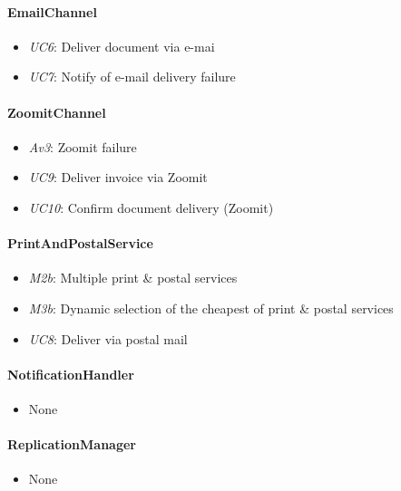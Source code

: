 \documentclass[a4paper,10pt]{article}
\begin{document}
\paragraph{EmailChannel}
\begin{itemize}
	\item \emph{UC6}: Deliver document via e-mai
	\item \emph{UC7}: Notify of e-mail delivery failure
\end{itemize}

\paragraph{ZoomitChannel}
\begin{itemize}
	\item \emph{Av3}: Zoomit failure
	\item \emph{UC9}: Deliver invoice via Zoomit
	\item \emph{UC10}: Confirm document delivery (Zoomit)
\end{itemize}

\paragraph{PrintAndPostalService}
\begin{itemize}
	\item \emph{M2b}: Multiple print \& postal services\\
	\item \emph{M3b}: Dynamic selection of the cheapest of print \& postal services\\
	\item \emph{UC8}: Deliver via postal mail
\end{itemize}

\paragraph{NotificationHandler}
\begin{itemize}
	\item None
\end{itemize}

\paragraph{ReplicationManager}
\begin{itemize}
	\item None
\end{itemize}
\end{document}
